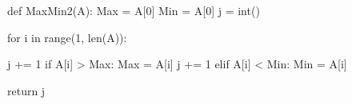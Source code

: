 \begin{python}
def MaxMin2(A):
    Max = A[0]
    Min = A[0]
    j = int()

    for i in range(1, len(A)):

        j += 1 %
        if A[i] > Max:
            Max = A[i]
            j += 1
        elif A[i] < Min:
            Min = A[i]

    return j %
\end{python}